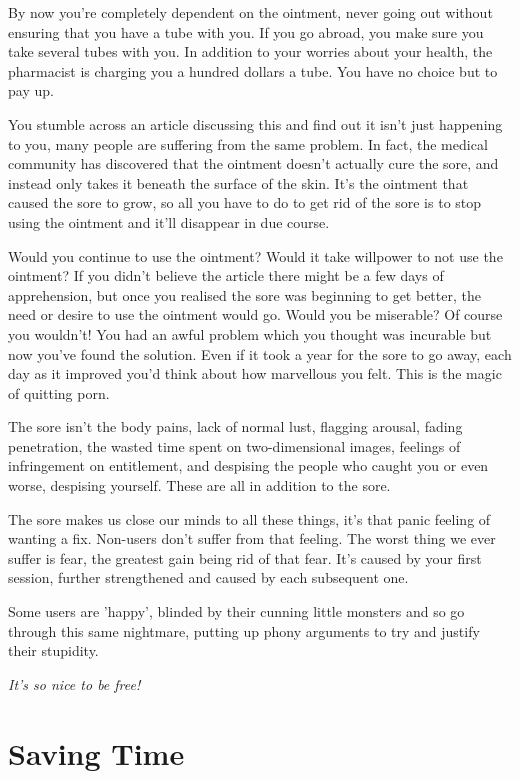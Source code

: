 \documentclass[
]{book}
\begin{document}
By now you're completely dependent on the ointment, never going out without ensuring that you have a tube with you. If you go abroad, you make sure you take several tubes with you. In addition to your worries about your health, the pharmacist is charging you a hundred dollars a tube. You have no choice but to pay up.

You stumble across an article discussing this and find out it isn't just happening to you, many people are suffering from the same problem. In fact, the medical community has discovered that the ointment doesn't actually cure the sore, and instead only takes it beneath the surface of the skin. It's the ointment that caused the sore to grow, so all you have to do to get rid of the sore is to stop using the ointment and it'll disappear in due course.

Would you continue to use the ointment? Would it take willpower to not use the ointment? If you didn't believe the article there might be a few days of apprehension, but once you realised the sore was beginning to get better, the need or desire to use the ointment would go. Would you be miserable? Of course you wouldn't! You had an awful problem which you thought was incurable but now you've found the solution. Even if it took a year for the sore to go away, each day as it improved you'd think about how marvellous you felt. This is the magic of quitting porn.

The sore isn't the body pains, lack of normal lust, flagging arousal, fading penetration, the wasted time spent on two-dimensional images, feelings of infringement on entitlement, and despising the people who caught you or even worse, despising yourself. These are all in addition to the sore.

The sore makes us close our minds to all these things, it's that panic feeling of wanting a fix. Non-users don't suffer from that feeling. The worst thing we ever suffer is fear, the greatest gain being rid of that fear. It's caused by your first session, further strengthened and caused by each subsequent one.

Some users are 'happy', blinded by their cunning little monsters and so go through this same nightmare, putting up phony arguments to try and justify their stupidity.

\emph{It's so nice to be free!}

\hypertarget{saving-time}{%
\chapter{Saving Time}\label{saving-time}}
\end{document}
